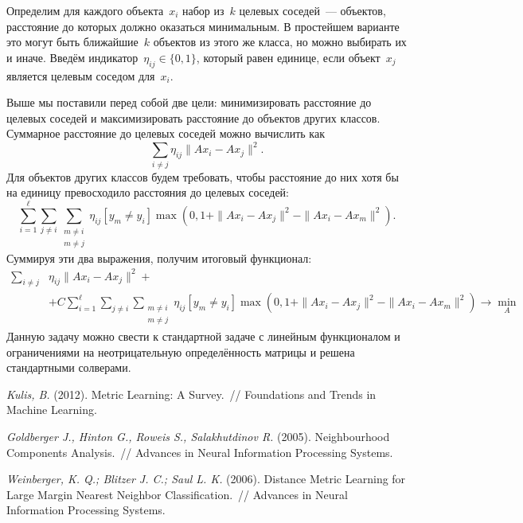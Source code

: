 \documentclass[12pt,fleqn]{article}
\begin{document}
Определим для каждого объекта~$x_i$ набор из~$k$ целевых соседей~---
объектов, расстояние до которых должно оказаться минимальным.
В простейшем варианте это могут быть ближайшие~$k$ объектов
из этого же класса, но можно выбирать их и иначе.
Введём индикатор~$\eta_{ij} \in \{0, 1\}$,
который равен единице, если объект~$x_j$ является целевым соседом для~$x_i$.

Выше мы поставили перед собой две цели: минимизировать расстояние до целевых соседей
и максимизировать расстояние до объектов других классов.
Суммарное расстояние до целевых соседей можно вычислить как
\[
    \sum_{i \neq j}
        \eta_{ij}
        \| A x_i - A x_j \|^2.
\]
Для объектов других классов будем требовать, чтобы расстояние до них хотя бы на единицу
превосходило расстояния до целевых соседей:
\[
    \sum_{i = 1}^{\ell}
    \sum_{j \neq i}
    \sum_{\substack{m \neq i \\ m \neq j}}
        \eta_{ij}
        [y_m \neq y_i]
        \max(0, 1 + \|Ax_i - Ax_j\|^2 - \|Ax_i - Ax_m\|^2).
\]
Суммируя эти два выражения, получим итоговый функционал:
\begin{align*}
    \sum_{i \neq j}
        &\eta_{ij}
        \| A x_i - A x_j \|^2+\\
    &+
    C
    \sum_{i = 1}^{\ell}
    \sum_{j \neq i}
    \sum_{\substack{m \neq i \\ m \neq j}}
        \eta_{ij}
        [y_m \neq y_i]
        \max(0, 1 + \|Ax_i - Ax_j\|^2 - \|Ax_i - Ax_m\|^2)
    \to
    \min_{A}
\end{align*}
Данную задачу можно свести к стандартной задаче с линейным функционалом
и ограничениями на неотрицательную определённость матрицы
и решена стандартными солверами.

\begin{thebibliography}{1}
    \emph{Kulis, B.} (2012).
    Metric Learning: A Survey.~//
    Foundations and Trends in Machine Learning.

    \emph{Goldberger J., Hinton G., Roweis S., Salakhutdinov R.} (2005).
    Neighbourhood Components Analysis.~//
    Advances in Neural Information Processing Systems.

    \emph{Weinberger, K. Q.; Blitzer J. C.; Saul L. K.} (2006).
    Distance Metric Learning for Large Margin Nearest Neighbor Classification.~//
    Advances in Neural Information Processing Systems.
\end{thebibliography}
\end{document}
